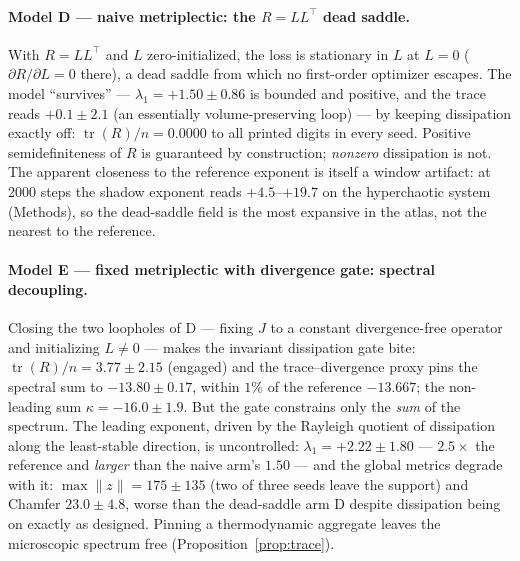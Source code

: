 \documentclass[journal]{IEEEtran}
\newcommand{\tr}{\operatorname{tr}}
\begin{document}
\paragraph{Model D --- naive metriplectic: the $R=LL^\top$ dead saddle.}
With $R=LL^\top$ and $L$ zero-initialized, the loss is stationary in $L$
at $L=0$ ($\partial R/\partial L=0$ there), a dead saddle from which no
first-order optimizer escapes. The model ``survives'' --- $\lambda_1=
+1.50\pm0.86$ is bounded and positive, and the trace reads $+0.1\pm2.1$
(an essentially volume-preserving loop) --- by keeping dissipation
exactly off: $\tr(R)/n=0.0000$ to all printed digits in every seed.
Positive semidefiniteness of $R$ is guaranteed by construction;
\emph{nonzero} dissipation is not. The apparent closeness to the
reference exponent is itself a window artifact: at 2000 steps the
shadow exponent reads $+4.5$--$+19.7$ on the hyperchaotic system
(Methods), so the dead-saddle field is the most expansive in the
atlas, not the nearest to the reference.

\paragraph{Model E --- fixed metriplectic with divergence gate: spectral
decoupling.}
Closing the two loopholes of D --- fixing $J$ to a constant
divergence-free operator and initializing $L\neq0$ --- makes the
invariant dissipation gate bite: $\tr(R)/n=3.77\pm2.15$ (engaged) and the
trace--divergence proxy pins the spectral sum to $-13.80\pm0.17$,
within $1\%$ of the reference $-13.667$; the non-leading sum
$\kappa=-16.0\pm1.9$. But the gate constrains only the \emph{sum} of the
spectrum. The leading exponent, driven by the Rayleigh quotient of
dissipation along the least-stable direction, is uncontrolled:
$\lambda_1=+2.22\pm1.80$ --- $2.5\times$ the reference and \emph{larger}
than the naive arm's $1.50$ --- and the global metrics degrade with it:
$\max\|z\|=175\pm135$ (two of three seeds leave the support) and Chamfer
$23.0\pm4.8$, worse than the dead-saddle arm D despite dissipation being
on exactly as designed. Pinning a thermodynamic aggregate leaves the
microscopic spectrum free (Proposition~\ref{prop:trace}).
\end{document}
